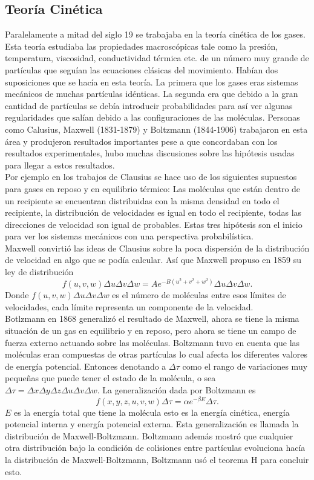 \subsection{Teoría Cinética}
Paralelamente a mitad del siglo 19 se trabajaba en la teoría cinética de los gases. Esta teoría estudiaba las propiedades macroscópicas tale como la presión, temperatura, viscosidad, conductividad térmica etc. de un número muy grande de partículas que seguían las ecuaciones clásicas del movimiento. Habían dos suposiciones que se hacía  en esta teoría. La primera que los gases eras sistemas mecánicos de muchas partículas idénticas. La segunda era que debido a la gran cantidad de partículas se debía introducir probabilidades para así ver algunas regularidades que salían debido a las configuraciones de las moléculas. Personas como Calusius, Maxwell (1831-1879) y Boltzmann (1844-1906) trabajaron en esta área y produjeron resultados importantes pese a que concordaban con los resultados experimentales, hubo muchas discusiones sobre las hipótesis usadas para llegar a estos resultados. 
\\
Por ejemplo en los trabajos de Clausius se hace uso de los siguientes supuestos para gases en reposo y en equilibrio térmico: Las moléculas que están dentro de un recipiente se encuentran distribuidas con la misma densidad en todo el recipiente, la distribución de velocidades es igual en todo el recipiente, todas las direcciones de velocidad son igual de probables. Estas tres hipótesis son el inicio para ver los sistemas mecánicos con una perspectiva probabilística. 
\\
Maxwell convirtió las ideas de Clausius sobre la  poca dispersión de la distribución de velocidad en algo que se podía calcular. Así que Maxwell propuso en 1859 su ley de distribución
\begin{equation}
f(u,v,w) \Delta u \Delta v \Delta w = A e^{-B(u^{2}+v^{2}+w^{2})}  \Delta u \Delta v \Delta w.
\end{equation}
Donde $f(u,v,w) \Delta u \Delta v \Delta w $ es el número de moléculas entre esos límites de velocidades, cada límite representa un componente de la velocidad.
\\
Botlzmann en 1868 generalizó el resultado de Maxwell, ahora se tiene la misma situación de un gas en equilibrio y en reposo, pero ahora se tiene un campo de fuerza externo actuando sobre las moléculas. Boltzmann tuvo en cuenta que las moléculas eran compuestas de otras partículas  lo cual afecta los diferentes valores de energía potencial. Entonces denotando a $\Delta \tau$ como el rango de variaciones muy pequeñas que puede tener el estado de la molécula, o sea $\Delta \tau= \Delta x \Delta y \Delta z \Delta u \Delta v \Delta w$. La generalización dada por Boltzmann es
\begin{equation}
f(x,y,z,u,v,w) \Delta \tau = \alpha e^{-\beta E} \Delta \tau.
\end{equation}
$E$ es la energía total que tiene la molécula esto es la energía cinética, energía potencial interna y energía potencial externa. Esta generalización es llamada la distribución de Maxwell-Boltzmann. Boltzmann además mostró que cualquier otra distribución bajo la condición de colisiones entre partículas evoluciona hacía la distribución de Maxwell-Boltzmann, Boltzmann usó el teorema H para concluir esto.
